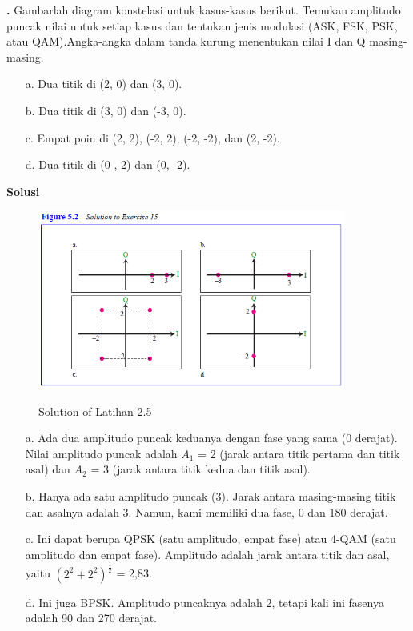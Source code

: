 \documentclass[oneside]{book}
\newcommand{\exercisename}{Latihan}
\newcommand{\solutionname}{Solusi}
\newcounter{exer}[chapter]
\renewcommand{\theexer}{\thechapter.\arabic{exer}}
\newenvironment{exercise}[1][]{
  \refstepcounter{exer}
  \par\noindent\textbf{\color{main}{\exercisename} \theexer #1 }\rmfamily}{
  \par\ignorespacesafterend}
\newenvironment{solution}{\par\noindent\textbf{\color{main}\solutionname} \em}{\par}
\begin{document}
\begin{exercise}
  Gambarlah diagram konstelasi untuk kasus-kasus berikut. Temukan amplitudo puncak nilai untuk setiap kasus dan tentukan jenis modulasi (ASK, FSK, PSK, atau QAM).Angka-angka dalam tanda kurung menentukan nilai I dan Q masing-masing.
  \begin{itemize}
    \item[a.] Dua titik di (2, 0) dan (3, 0).
    \item[b.] Dua titik di (3, 0) dan (-3, 0).
    \item[c.] Empat poin di (2, 2), (-2, 2), (-2, -2), dan (2, -2).
    \item[d.] Dua titik di (0 , 2) dan (0, -2).
  \end{itemize}
    
\end{exercise}

\begin{solution}
  \begin{figure}[ht]
  \centering
  \includegraphics[width=0.9\textwidth]{picture/figure-5.2.png}
  \centerline{Solution of Latihan 2.5}\vspace*{2px}
\end{figure}
\begin{itemize}
    \item[a.] Ada dua amplitudo puncak keduanya dengan fase yang sama (0 derajat). Nilai amplitudo puncak adalah $A_1$ = 2 (jarak antara titik pertama dan titik asal) dan $A_2$ = 3 (jarak antara titik kedua dan titik asal). 
    \item[b.] Hanya ada satu amplitudo puncak (3). Jarak antara masing-masing titik dan asalnya adalah 3. Namun, kami memiliki dua fase, 0 dan 180 derajat.
    \item[c.] Ini dapat berupa QPSK (satu amplitudo, empat fase) atau 4-QAM (satu amplitudo dan empat fase). Amplitudo adalah jarak antara titik dan asal, yaitu $ (2^2 + 2^2)^\frac{1}{2} $ = 2,83.
    \item[d.] Ini juga BPSK. Amplitudo puncaknya adalah 2, tetapi kali ini fasenya adalah 90 dan 270 derajat.
  \end{itemize} 
\end{solution}
\end{document}
